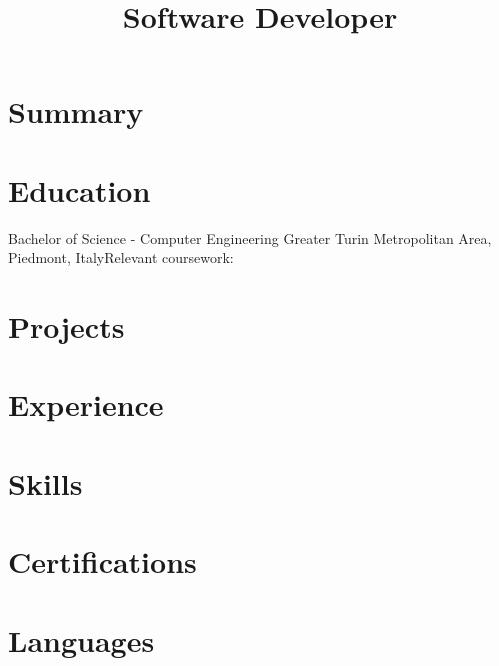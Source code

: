 \documentclass[letterpaper, nocolor, draft]{moderncv}
\title{Software Developer}
\begin{document}
\maketitle

\section{Summary}

\section{Education}
 {Bachelor of Science - Computer Engineering}{
Greater Turin Metropolitan Area, Piedmont, Italy}{}{Relevant coursework:   }

\section{Projects}

\section{Experience}

\section{Skills}

\section{Certifications}

\section{Languages}
\end{document}
